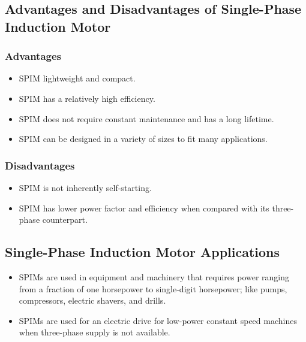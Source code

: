 \documentclass[journal]{IEEEtran}
\begin{document}
\subsection{Advantages and Disadvantages of Single-Phase Induction Motor}
\subsubsection{Advantages}
\begin{itemize}
    \item SPIM lightweight and compact.
    \item SPIM has a relatively high efficiency.
    \item SPIM does not require constant maintenance and has a long lifetime\cite{adv_induction1}.
    \item SPIM can be designed in a variety of sizes to fit many applications\cite{adv_induction1}.
\end{itemize}
\subsubsection{Disadvantages}
\begin{itemize}
    \item SPIM is not inherently self-starting\cite{adv_induction1}.
    \item SPIM has lower power factor and efficiency when compared with its three-phase counterpart\cite{adv_induction1}. 
\end{itemize}

\subsection{Single-Phase Induction Motor Applications}
\begin{itemize}
    \item SPIMs are used in equipment and machinery that requires power ranging from a fraction of one horsepower to single-digit horsepower; like pumps, compressors, electric shavers, and drills\cite{uses_induction}.
    \item SPIMs are used for an electric drive for low-power constant speed machines when three-phase supply is not available\cite{uses_induction}.
\end{itemize}

\end{document}
